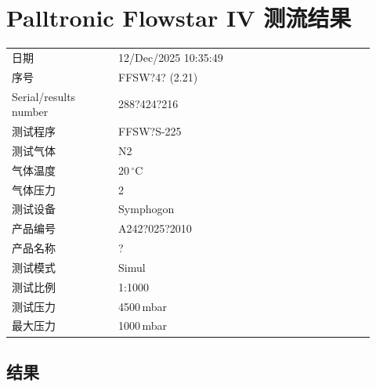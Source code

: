 \documentclass[UTF8,10pt,a4paper,fontset=fandol]{ctexart}
\newcommand{\fieldvalue}[1]{#1}
\begin{document}
\section{Palltronic Flowstar IV 测流结果}

\begin{tabular}{@{}p{0.27\linewidth}p{0.65\linewidth}@{}}
日期 &
\fieldvalue{12/Dec/2025 10:35:49}
\\
序号 &
\fieldvalue{FFSW?4? (2.21)}
\\
Serial/results number &
\fieldvalue{288?424?216}
\\
测试程序 &
\fieldvalue{FFSW?S-225}
\\
测试气体 &
\fieldvalue{N2}
\\
气体温度 &
\fieldvalue{20\,${}^{\circ}$C}
\\
气体压力 &
\fieldvalue{2}
\\
测试设备 &
\fieldvalue{Symphogon}
\\
产品编号 &
\fieldvalue{A242?025?2010}
\\
产品名称 &
\fieldvalue{?}
\\
测试模式 &
\fieldvalue{Simul}
\\
测试比例 &
\fieldvalue{1:1000}
\\
测试压力 &
\fieldvalue{4500\,mbar}
\\
最大压力 &
\fieldvalue{1000\,mbar}
\end{tabular}

\subsection{结果}
\end{document}

